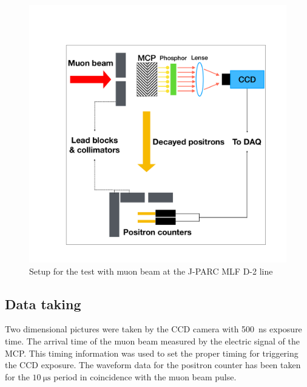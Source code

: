 \documentclass[preprint,3p,twocolumn]{elsarticle}
\begin{document}
\begin{figure}[tb]
{\setlength{\belowdisplayskip}{0pt}
\begin{minipage}[t]{60mm}
\includegraphics[width=1.25\textwidth, height=1.25\textwidth]{figure/BPM_schematic.pdf}
\end{minipage}
}
\caption{Setup for the test with muon beam at the J-PARC MLF D-2 line}
\vspace{-0.4cm}
\label{fig:simulation}
\end{figure}

\subsection{Data taking} 
Two dimensional pictures were taken by the CCD camera with \SI{500}{\nano\s} exposure time.
The arrival time of the muon beam measured by the electric signal of the MCP. This timing information was used 
to set the proper timing for triggering the CCD exposure. The waveform data for the positron counter has been taken for the $\SI{10}{\micro\s}$ period in coincidence with the muon beam pulse.
\end{document}
